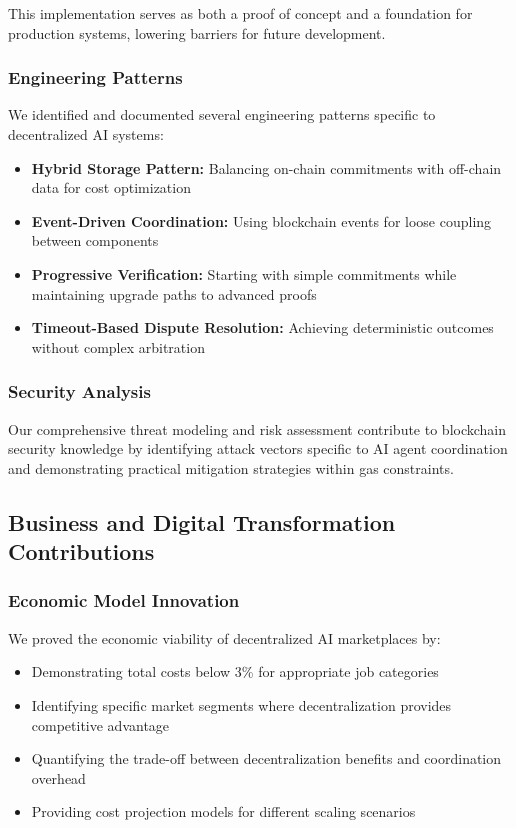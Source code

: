 This implementation serves as both a proof of concept and a foundation for production systems, lowering barriers for future development.

\subsubsection{Engineering Patterns}
We identified and documented several engineering patterns specific to decentralized AI systems:
\begin{itemize}
    \item \textbf{Hybrid Storage Pattern:} Balancing on-chain commitments with off-chain data for cost optimization
    \item \textbf{Event-Driven Coordination:} Using blockchain events for loose coupling between components
    \item \textbf{Progressive Verification:} Starting with simple commitments while maintaining upgrade paths to advanced proofs
    \item \textbf{Timeout-Based Dispute Resolution:} Achieving deterministic outcomes without complex arbitration
\end{itemize}

\subsubsection{Security Analysis}
Our comprehensive threat modeling and risk assessment contribute to blockchain security knowledge by identifying attack vectors specific to AI agent coordination and demonstrating practical mitigation strategies within gas constraints.

\subsection{Business and Digital Transformation Contributions}

\subsubsection{Economic Model Innovation}
We proved the economic viability of decentralized AI marketplaces by:
\begin{itemize}
    \item Demonstrating total costs below 3\% for appropriate job categories
    \item Identifying specific market segments where decentralization provides competitive advantage
    \item Quantifying the trade-off between decentralization benefits and coordination overhead
    \item Providing cost projection models for different scaling scenarios
\end{itemize}

